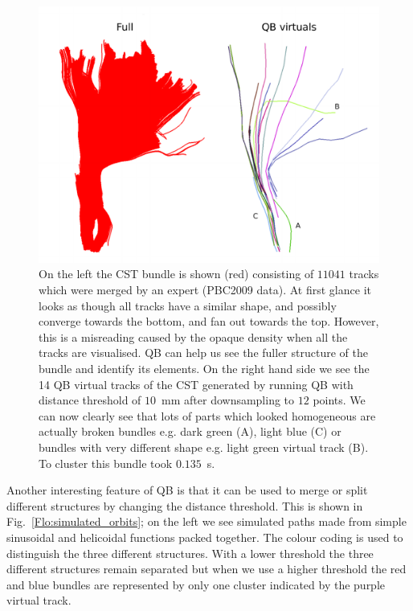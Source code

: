 \documentclass[journal]{IEEEtran}
\begin{document}
%
\begin{figure}
\begin{centering}
\includegraphics[scale=0.26]{Fig_4_cst_simplification}
\par\end{centering}
\caption{On the left the CST bundle is shown (red) consisting of $11041$
  tracks which were merged by an expert (PBC2009 data). At first glance
  it looks as though all tracks have a similar shape, and possibly
  converge towards the bottom, and fan out towards the top. However,
  this is a misreading caused by the opaque density when all the tracks
  are visualised.  QB can help us see the fuller structure of the bundle
  and identify its elements. On the right hand side we see the 14 QB
  virtual tracks of the CST generated by running QB with distance
  threshold of $10$~mm after downsampling to $12$ points. We can now
  clearly see that lots of parts which looked homogeneous are actually
  broken bundles e.g. dark green (A), light blue (C) or bundles with
  very different shape e.g. light green virtual track (B). To cluster
  this bundle took $0.135$~s.\label{Flo:cst_pbc}}
\end{figure}

Another interesting feature of QB is that it can be used to merge or
split different structures by changing the distance threshold.  This is
shown in Fig.~\ref{Flo:simulated_orbits}; on the left we see simulated
paths made from simple sinusoidal and helicoidal functions packed
together. The colour coding is used to distinguish the three different
structures. With a lower threshold the three different structures remain
separated but when we use a higher threshold the red and blue bundles
are represented by only one cluster indicated by the purple virtual
track.
\end{document}
